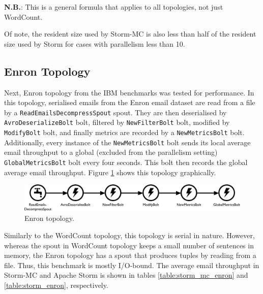 \documentclass[bsc,twoside,singlespacing,normalheadings,parskip]{infthesis}\usepackage[]{graphicx}\usepackage[]{color}
\begin{document}
\textbf{N.B.}\@\xspace: This is a general formula that applies to all topologies, not just WordCount.

Of note, the resident size used by Storm-MC is also less than half of the resident size used by Storm for cases with parallelism less than 10.

\subsection{Enron Topology}

Next, Enron topology from the IBM benchmarks was tested for performance. In this topology, serialised emails from the Enron email dataset are read from a file by a \texttt{ReadEmailsDecompressSpout} spout. They are then deserialised by \texttt{AvroDeserializeBolt} bolt, filtered by \texttt{NewFilterBolt} bolt, modified by \texttt{ModifyBolt} bolt, and finally metrics are recorded by a \texttt{NewMetricsBolt} bolt. Additionally, every instance of the \texttt{NewMetricsBolt} bolt sends its local average email throughput to a global (excluded from the parallelism setting) \texttt{GlobalMetricsBolt} bolt every four seconds. This bolt then records the global average email throughput. Figure \ref{fig:enron_topology} shows this topology graphically.

\begin{figure}[!htb]
\begin{adjustwidth}{-0.5in}{-0.5in}
	\centering
	\includegraphics[scale=0.475]{pdf/enron_topology.pdf}
	\caption{Enron topology.}
	\label{fig:enron_topology}
\end{adjustwidth}
\end{figure}

Similarly to the WordCount topology, this topology is serial in nature. However, whereas the spout in  WordCount topology keeps a small number of sentences in memory, the Enron topology has a spout that produces tuples by reading from a file. Thus, this benchmark is mostly I/O-bound. The average email throughput in Storm-MC and Apache Storm is shown in tables \ref{table:storm_mc_enron} and \ref{table:storm_enron}, respectively. 
\end{document}
